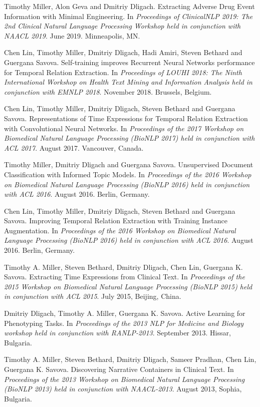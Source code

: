 \documentclass[letterpaper]{article}
\renewenvironment{itemize}{
  \begin{list}{}{
    \setlength{\leftmargin}{1.5em}
  }
}{
  \end{list}
}
\begin{document}
\begin{itemize}
\item Timothy Miller, Alon Geva and Dmitriy Dligach. Extracting Adverse Drug Event Information with Minimal Engineering. In \emph{Proceedings of ClinicalNLP 2019: The 2nd Clinical Natural Language Processing Workshop held in conjunction with NAACL 2019}. June 2019. Minneapolis, MN.
\item Chen Lin, Timothy Miller, Dmitriy Dligach, Hadi Amiri, Steven Bethard and Guergana Savova. Self-training improves Recurrent Neural Networks performance for Temporal Relation Extraction. In \emph{Proceedings of LOUHI 2018: The Ninth International Workshop on Health Text Mining and Information Analysis held in conjunction with EMNLP 2018}. November 2018. Brussels, Belgium.
\item Chen Lin, Timothy Miller, Dmitriy Dligach, Steven Bethard and Guergana Savova. Representations of Time Expressions for Temporal Relation Extraction with Convolutional Neural Networks. In \emph{Proceedings of the 2017 Workshop on Biomedical Natural Language Processing (BioNLP 2017) held in conjunction with ACL 2017}. August 2017. Vancouver, Canada.
\item Timothy Miller, Dmitriy Dligach and Guergana Savova. Unsupervised Document Classification with Informed Topic Models. In \emph{Proceedings of the 2016 Workshop on Biomedical Natural Language Processing (BioNLP 2016) held in conjunction with ACL 2016}. August 2016. Berlin, Germany.
\item Chen Lin, Timothy Miller, Dmitriy Dligach, Steven Bethard and Guergana Savova. Improving Temporal Relation Extraction with Training Instance Augmentation. In \emph{Proceedings of the 2016 Workshop on Biomedical Natural Language Processing (BioNLP 2016) held in conjunction with ACL 2016}. August 2016. Berlin, Germany.
\item Timothy A. Miller, Steven Bethard, Dmitriy Dligach, Chen Lin, Guergana K. Savova. Extracting Time Expressions from Clinical Text. In \emph{Proceedings of the 2015 Workshop on Biomedical Natural Language Processing (BioNLP 2015) held in conjunction with ACL 2015}. July 2015, Beijing, China.
\item Dmitriy Dligach, Timothy A. Miller, Guergana K. Savova. Active Learning for Phenotyping Tasks. In \emph{Proceedings of the 2013 NLP for Medicine and Biology workshop held in conjunction with RANLP-2013}. September 2013. Hissar, Bulgaria.
\item Timothy A. Miller, Steven Bethard, Dmitriy Dligach, Sameer Pradhan, Chen Lin, Guergana K. Savova. Discovering Narrative Containers in Clinical Text. In \emph{Proceedings of the 2013 Workshop on Biomedical Natural Language Processing (BioNLP 2013) held in conjunction with NAACL-2013}. August 2013, Sophia, Bulgaria.

\end{itemize}
\end{document}
